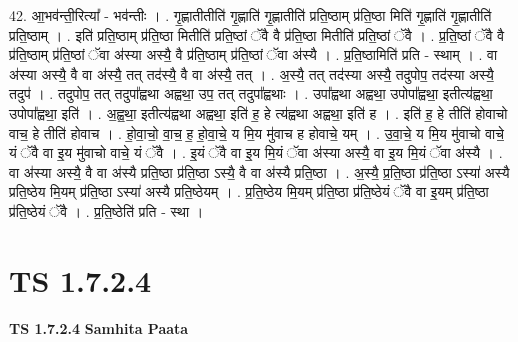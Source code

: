 \documentclass[17pt]{extarticle}
\begin{document}
42. आ॒भव॑न्ती॒रित्या᳚ - भव॑न्तीः । . गृ॒ह्णातीतीति॑ गृ॒ह्णाति॑ गृ॒ह्णातीति॑ प्रति॒ष्ठाम् प्र॑ति॒ष्ठा मिति॑ गृ॒ह्णाति॑ गृ॒ह्णातीति॑ प्रति॒ष्ठाम् । . इति॑ प्रति॒ष्ठाम् प्र॑ति॒ष्ठा मितीति॑ प्रति॒ष्ठां ॅवै वै प्र॑ति॒ष्ठा मितीति॑ प्रति॒ष्ठां ॅवै । . प्र॒ति॒ष्ठां ॅवै वै प्र॑ति॒ष्ठाम् प्र॑ति॒ष्ठां ॅवा अ॑स्या अस्यै॒ वै प्र॑ति॒ष्ठाम् प्र॑ति॒ष्ठां ॅवा अ॑स्यै । . प्र॒ति॒ष्ठामिति॑ प्रति - स्थाम् । . वा अ॑स्या अस्यै॒ वै वा अ॑स्यै॒ तत् तद॑स्यै॒ वै वा अ॑स्यै॒ तत् । . अ॒स्यै॒ तत् तद॑स्या अस्यै॒ तदुपोप॒ तद॑स्या अस्यै॒ तदुप॑ । . तदुपोप॒ तत् तदुपा᳚ह्वथा अह्वथा॒ उप॒ तत् तदुपा᳚ह्वथाः । . उपा᳚ह्वथा अह्वथा॒ उपोपा᳚ह्वथा॒ इतीत्य॑ह्वथा॒ उपोपा᳚ह्वथा॒ इति॑ । . अ॒ह्व॒था॒ इतीत्य॑ह्वथा अह्वथा॒ इति॑ ह॒ हे त्य॑ह्वथा अह्वथा॒ इति॑ ह । . इति॑ ह॒ हे तीति॑ होवाचो वाच॒ हे तीति॑ होवाच । . हो॒वा॒चो॒ वा॒च॒ ह॒ हो॒वा॒चे॒ य मि॒य मु॑वाच ह होवाचे॒ यम् । . उ॒वा॒चे॒ य मि॒य मु॑वाचो वाचे॒ यं ॅवै वा इ॒य मु॑वाचो वाचे॒ यं ॅवै । . इ॒यं ॅवै वा इ॒य मि॒यं ॅवा अ॑स्या अस्यै॒ वा इ॒य मि॒यं ॅवा अ॑स्यै । . वा अ॑स्या अस्यै॒ वै वा अ॑स्यै प्रति॒ष्ठा प्र॑ति॒ष्ठा ऽस्यै॒ वै वा अ॑स्यै प्रति॒ष्ठा । . अ॒स्यै॒ प्र॒ति॒ष्ठा प्र॑ति॒ष्ठा ऽस्या॑ अस्यै प्रति॒ष्ठेय मि॒यम् प्र॑ति॒ष्ठा ऽस्या॑ अस्यै प्रति॒ष्ठेयम् । . प्र॒ति॒ष्ठेय मि॒यम् प्र॑ति॒ष्ठा प्र॑ति॒ष्ठेयं ॅवै वा इ॒यम् प्र॑ति॒ष्ठा प्र॑ति॒ष्ठेयं ॅवै । . प्र॒ति॒ष्ठेति॑ प्रति - स्था । \newline
\pagebreak
{}

\section{ TS 1.7.2.4 }

\textbf{TS 1.7.2.4 } \newline
\textbf{Samhita Paata} \newline
\end{document}
